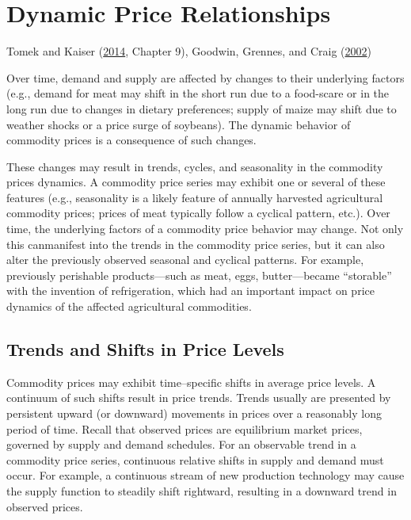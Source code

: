 \documentclass[
]{book}
\begin{document}
\hypertarget{dynamic-price-relationships}{%
\chapter{Dynamic Price Relationships}\label{dynamic-price-relationships}}

Tomek and Kaiser (\protect\hyperlink{ref-tomek2014}{2014}, Chapter 9), Goodwin, Grennes, and Craig (\protect\hyperlink{ref-goodwin2002}{2002})

Over time, demand and supply are affected by changes to their underlying factors (e.g., demand for meat may shift in the short run due to a food-scare or in the long run due to changes in dietary preferences; supply of maize may shift due to weather shocks or a price surge of soybeans). The dynamic behavior of commodity prices is a consequence of such changes.

These changes may result in trends, cycles, and seasonality in the commodity prices dynamics. A commodity price series may exhibit one or several of these features (e.g., seasonality is a likely feature of annually harvested agricultural commodity prices; prices of meat typically follow a cyclical pattern, etc.). Over time, the underlying factors of a commodity price behavior may change. Not only this canmanifest into the trends in the commodity price series, but it can also alter the previously observed seasonal and cyclical patterns. For example, previously perishable products---such as meat, eggs, butter---became ``storable'' with the invention of refrigeration, which had an important impact on price dynamics of the affected agricultural commodities.

\hypertarget{trends-and-shifts-in-price-levels}{%
\section{Trends and Shifts in Price Levels}\label{trends-and-shifts-in-price-levels}}

Commodity prices may exhibit time--specific shifts in average price levels. A continuum of such shifts result in price trends. Trends usually are presented by persistent upward (or downward) movements in prices over a reasonably long period of time. Recall that observed prices are equilibrium market prices, governed by supply and demand schedules. For an observable trend in a commodity price series, continuous relative shifts in supply and demand must occur. For example, a continuous stream of new production technology may cause the supply function to steadily shift rightward, resulting in a downward trend in observed prices.
\end{document}
